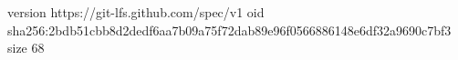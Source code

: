 version https://git-lfs.github.com/spec/v1
oid sha256:2bdb51cbb8d2dedf6aa7b09a75f72dab89e96f0566886148e6df32a9690c7bf3
size 68
